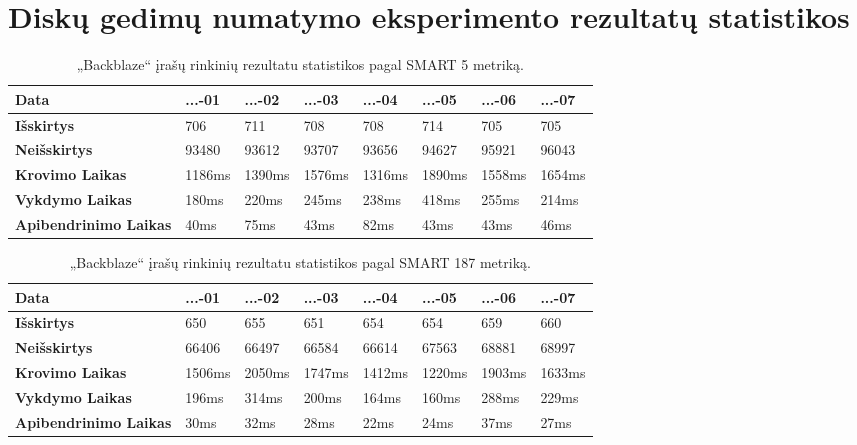 \documentclass{VUMIFPSkursinis}
\begin{document}
\section{Diskų gedimų numatymo eksperimento rezultatų statistikos} \label{sec:rezStats}
\begin{table}[H]
\centering
\caption{„Backblaze“ įrašų rinkinių rezultatu statistikos pagal SMART 5 metriką.}
\label{tab:time5}
{\begin{tabular}{|l|l|l|l|l|l|l|l|}
\hline
\textbf{Data}                 & ...-01	   & ...-02     & ...-03     & ...-04 	  & ...-05     & ...-06     & ...-07     \\ \hline
\textbf{Išskirtys}            & 706        & 711        & 708        & 708        & 714        & 705        & 705        \\ \hline
\textbf{Neišskirtys}          & 93480      & 93612      & 93707      & 93656      & 94627      & 95921      & 96043      \\ \hline
\textbf{Krovimo Laikas}       & 1186ms     & 1390ms     & 1576ms     & 1316ms     & 1890ms     & 1558ms     & 1654ms     \\ \hline
\textbf{Vykdymo Laikas}       & 180ms      & 220ms      & 245ms      & 238ms      & 418ms      & 255ms      & 214ms      \\ \hline
\textbf{Apibendrinimo Laikas} & 40ms       & 75ms       & 43ms       & 82ms       & 43ms       & 43ms       & 46ms       \\ \hline
\end{tabular}}
\end{table}

\begin{table}[H]
\centering
\caption{„Backblaze“ įrašų rinkinių rezultatu statistikos pagal SMART 187 metriką.}
\label{tab:time187}
\begin{tabular}{|l|l|l|l|l|l|l|l|}
\hline
\textbf{Data}                 & ...-01	   & ...-02     & ...-03     & ...-04 	  & ...-05     & ...-06     & ...-07     \\ \hline
\textbf{Išskirtys}            & 650        & 655        & 651        & 654        & 654        & 659        & 660        \\ \hline
\textbf{Neišskirtys}          & 66406      & 66497      & 66584      & 66614      & 67563      & 68881      & 68997      \\ \hline
\textbf{Krovimo Laikas}       & 1506ms     & 2050ms     & 1747ms     & 1412ms     & 1220ms     & 1903ms     & 1633ms     \\ \hline
\textbf{Vykdymo Laikas}       & 196ms      & 314ms      & 200ms      & 164ms      & 160ms      & 288ms      & 229ms      \\ \hline
\textbf{Apibendrinimo Laikas} & 30ms       & 32ms       & 28ms       & 22ms       & 24ms       & 37ms       & 27ms       \\ \hline
\end{tabular}
\end{table}
\end{document}
